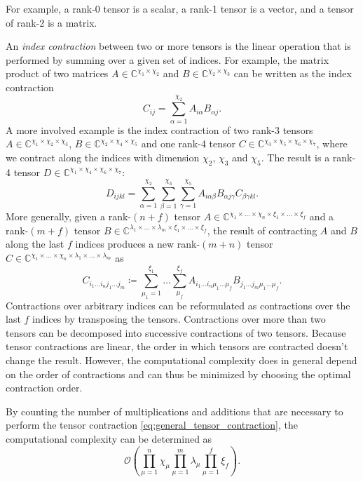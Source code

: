 For example, a rank-0 tensor is a scalar, a rank-1 tensor is a vector, and a tensor of rank-2 is a matrix. \par
An \textit{index contraction} between two or more tensors is the linear operation that is performed by summing over a given set of indices. For example, the matrix product of two matrices $A \in \mathbb{C}^{\chi_1\times\chi_2}$ and $B \in \mathbb{C}^{\chi_2\times\chi_3}$ can be written as the index contraction
\begin{equation}
	\label{eq:example_tensor_network_matrix_product}
	C_{ij} = \sum_{\alpha=1}^{\chi_2} A_{i\alpha} B_{\alpha j}.
\end{equation}
A more involved example is the index contraction of two rank-3 tensors $A\in\mathbb{C}^{\chi_1\times\chi_2\times\chi_3}$, $B\in\mathbb{C}^{\chi_2\times\chi_4\times\chi_5}$ and one rank-4 tensor $C\in\mathbb{C}^{\chi_3\times\chi_5\times\chi_6\times\chi_7}$, where we contract along the indices with dimension $\chi_2$, $\chi_3$ and $\chi_5$. The result is a rank-4 tensor $D\in\mathbb{C}^{\chi_1\times\chi_4\times\chi_6\times\chi_7}$:
\begin{equation}
	\label{eq:example_tensor_network_involved_network}
	D_{ijkl} = \sum_{\alpha=1}^{\chi_2} \sum_{\beta=1}^{\chi_3} \sum_{\gamma=1}^{\chi_5} A_{i \alpha \beta} B_{\alpha j\gamma} C_{\beta \gamma k l}.
\end{equation}
More generally, given a rank-$(n+f)$ tensor $A \in \mathbb{C}^{\chi_1\times\dots\times\chi_n\times\xi_{1}\times\dots\times\xi_{f}}$ and a rank-$(m+f)$ tensor $B \in \mathbb{C}^{\lambda_1\times\dots\times\lambda_m\times\xi_1\times\dots\times\xi_f}$, the result of contracting $A$ and $B$ along the last $f$ indices produces a new rank-$(m+n)$ tensor $C \in \mathbb{C}^{\chi_1\times\dots\times\chi_n\times\lambda_1\times\dots\times\lambda_m}$ as
\begin{equation}
	\label{eq:general_tensor_contraction}
	C_{i_1\dots i_nj_1\dots j_m} \coloneqq \sum_{\mu_1 = 1}^{\xi_1} \dots \sum_{\mu_f}^{\xi_f} A_{i_1\dots i_n\mu_1\dots\mu_f} B_{j_1\dots j_m\mu_1\dots\mu_f}.
\end{equation}
Contractions over arbitrary indices can be reformulated as contractions over the last $f$ indices by transposing the tensors. Contractions over more than two tensors can be decomposed into successive contractions of two tensors. Because tensor contractions are linear, the order in which tensors are contracted doesn't change the result. However, the computational complexity does in general depend on the order of contractions and can thus be minimized by choosing the optimal contraction order.\par
By counting the number of multiplications and additions that are necessary to perform the tensor contraction \eqref{eq:general_tensor_contraction}, the computational complexity can be determined as
\begin{equation}
	\label{eq:tensor_contraction_general_computational_complexity}
	\mathcal{O}\left(\prod_{\mu=1}^{n}\chi_\mu \prod_{\mu=1}^{m}\lambda_\mu \prod_{\mu=1}^{f}\xi_f\right).
\end{equation}
